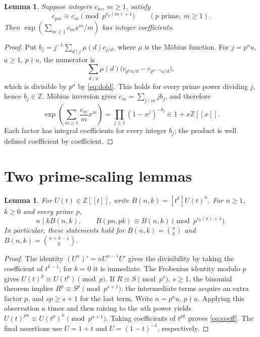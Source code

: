 \documentclass[11pt]{article}
\newtheorem{lemma}[theorem]{Lemma}
\newcommand{\Z}{\mathbb Z}
\newcommand{\vp}{v_p}
\begin{document}
\begin{lemma}\label{lem:dold}
Suppose integers $c_m$, $m\geq1$, satisfy
\begin{equation}\label{eq:dold}
 c_{pm}\equiv c_m\pmod{p^{\vp(m)+1}}
 \qquad(p\text{ prime},\ m\geq1).
\end{equation}
Then $\exp(\sum_{m\geq1}c_mx^m/m)$ has integer coefficients.
\end{lemma}
\begin{proof}
Put $b_j=j^{-1}\sum_{d\mid j}\mu(d)c_{j/d}$, where $\mu$ is the M\"obius function.
For $j=p^a u$, $a\geq1$, $p\nmid u$, the numerator is
\[
 \sum_{d\mid u}\mu(d)\bigl(c_{p^a u/d}-c_{p^{a-1}u/d}\bigr),
\]
which is divisible by $p^a$ by \eqref{eq:dold}. This holds for every prime
power dividing $j$, hence $b_j\in\Z$.
M\"obius inversion gives $c_m=\sum_{j\mid m}j b_j$, and therefore
\[
 \exp\!\left(\sum_{m\geq1}\frac{c_m}{m}x^m\right)
   =\prod_{j\geq1}(1-x^j)^{-b_j}\in1+x\Z[[x]].
\]
Each factor has integral coefficients for every integer $b_j$; the product
is well defined coefficient by coefficient.
\end{proof}

\section{Two prime-scaling lemmas}
\begin{lemma}\label{lem:coeff}
For $U(t)\in\Z[[t]]$, write $B(n,k)=[t^k]U(t)^n$. For $n\geq1$, $k\geq0$
and every prime $p$,
\begin{equation}\label{eq:coeff}
 n\mid kB(n,k),\qquad
 B(pn,pk)\equiv B(n,k)\pmod{p^{\vp(n)+1}}.
\end{equation}
In particular, these statements hold for $B(n,k)=\binom nk$ and
$B(n,k)=\binom{n+k-1}{k}$.
\end{lemma}
\begin{proof}
The identity $(U^n)'=nU^{n-1}U'$ gives the divisibility by taking the
coefficient of $t^{k-1}$; for $k=0$ it is immediate.
The Frobenius identity modulo $p$ gives
$U(t)^p\equiv U(t^p)\pmod p$.
If $R\equiv S\pmod{p^s}$, $s\geq1$, the binomial theorem implies
$R^p\equiv S^p\pmod{p^{s+1}}$: the intermediate terms acquire an extra
factor $p$, and $sp\geq s+1$ for the last term.
Write $n=p^a u$, $p\nmid u$. Applying this observation $a$ times and then
raising to the $u$th power yields
$U(t)^{pn}\equiv U(t^p)^n\pmod{p^{a+1}}$.
Taking coefficients of $t^{pk}$ proves \eqref{eq:coeff}.
The final assertions use $U=1+t$ and $U=(1-t)^{-1}$, respectively.
\end{proof}
\end{document}
